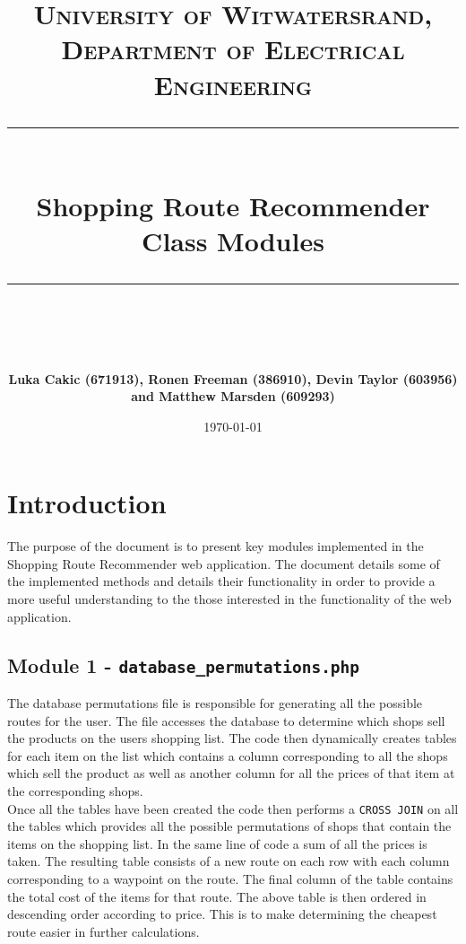 \documentclass[10pt, a4paper, onecolumn]{scrartcl}
\newcommand{\horrule}[1]{\rule{\linewidth}{#1}}
\begin{document}
	
	\title{\normalfont \normalsize
		\textsc{University of Witwatersrand, Department of Electrical Engineering} \\ [10pt]
		\horrule{0.5pt} \\ [10pt]
		\huge Shopping Route Recommender Class Modules \\
		\horrule{2pt} \\ [10pt]}
	\author{\textbf{\normalsize{Luka Cakic (671913), Ronen Freeman (386910), Devin Taylor (603956) and Matthew Marsden (609293)}} \\ [10pt]}
	\date {\normalsize \today}
	
	\maketitle
	

	\section{Introduction}
	
		 The purpose of the document is to present key modules implemented in the Shopping Route Recommender web application. The document details some of the implemented methods and details their functionality in order to provide a more useful understanding to the those interested in the functionality of the web application. \\
		 
			\subsection{Module 1 - \texttt{database\_permutations.php}}
			
				The database permutations file is responsible for generating all the possible routes for the user. The file accesses the database to determine which shops sell the products on the users shopping list. The code then dynamically creates tables for each item on the list which contains a column corresponding to all the shops which sell the product as well as another column for all the prices of that item at the corresponding shops. \\
				
				Once all the tables have been created the code then performs a \texttt{CROSS JOIN} on all the tables which provides all the possible permutations of shops that contain the items on the shopping list. In the same line of code a sum of all the prices is taken. The resulting table consists of a new route on each row with each column corresponding to a waypoint on the route. The final column of the table contains the total cost of the items for that route. The above table is then ordered in descending order according to price. This is to make determining the cheapest route easier in further calculations. 
			
\end{document}
